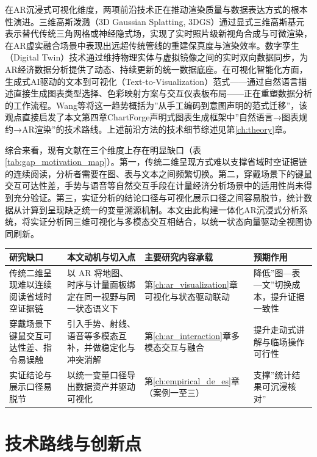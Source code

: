 在AR沉浸式可视化维度，两项前沿技术正在推动渲染质量与数据表达方式的根本性演进。三维高斯泼溅（3D Gaussian Splatting, 3DGS）\cite{kerbl20233dgaussian}通过显式三维高斯基元表示替代传统三角网格或神经隐式场，实现了实时照片级新视角合成与可微渲染，在AR虚实融合场景中表现出远超传统管线的重建保真度与渲染效率。数字孪生（Digital Twin）技术通过维持物理实体与虚拟镜像之间的实时双向数据同步，为AR经济数据分析提供了动态、持续更新的统一数据底座。在可视化智能化方面，生成式AI驱动的文本到可视化（Text-to-Visualization）范式——通过自然语言描述直接生成图表类型选择、色彩映射方案与交互仪表板布局——正在重塑数据分析的工作流程。Wang等\cite{wang2026ar_io_survey}将这一趋势概括为”从手工编码到意图声明的范式迁移”，该观点直接启发了本文第四章ChartForge声明式图表生成框架中”自然语言→图表规约→AR渲染”的技术路线。上述前沿方法的技术细节综述见第\ref{ch:theory}章。

综合来看，现有文献在三个维度上存在明显缺口（表\ref{tab:gap_motivation_map}）。第一，传统二维呈现方式难以支撑省域时空证据链的连续阅读，分析者需要在图、表与文本之间频繁切换。第二，穿戴场景下的键鼠交互可达性差，手势与语音等自然交互手段在计量经济分析场景中的适用性尚未得到充分验证。第三，实证分析的结论口径与可视化展示口径之间容易脱节，统计数据从计算到呈现缺乏统一的变量溯源机制。本文由此构建一体化AR沉浸式分析系统，将实证分析同三维可视化与多模态交互相结合，以统一状态向量驱动全视图协同刷新。

\begin{center}
    \small
    \begin{tabular}{p{3.4cm}p{4.3cm}p{3.6cm}p{3.2cm}}
    \hline
    研究缺口 & 本文动机与切入点 & 主要研究内容承载 & 预期作用 \\
    \hline
    传统二维呈现难以连续阅读省域时空证据链 & 以 AR 将地图、时序与计量面板绑定在同一视野与同一状态语义下 & 第\ref{ch:ar_visualization}章可视化与状态驱动联动 & 降低”图—表—文”切换成本，提升证据一致性 \\
    穿戴场景下键鼠交互可达性差、指令易误触 & 引入手势、射线、语音等多模态互补，并做稳定化与冲突消解 & 第\ref{ch:ar_interaction}章多模态交互与融合 & 提升走动式讲解与临场操作可行性 \\
    实证结论与展示口径易脱节 & 以统一变量口径导出数据资产并驱动可视化 & 第\ref{ch:empirical_de_es}章（案例一至三） & 支撑”统计结果可沉浸核对” \\
    \hline
    \end{tabular}
\end{center}

\section{技术路线与创新点}

